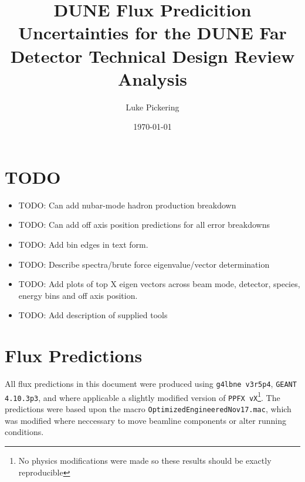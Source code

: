 \documentclass{article}
\title{DUNE Flux Predicition Uncertainties for the DUNE Far Detector Technical Design Review Analysis}
\author{Luke Pickering}
\date{\today}
\begin{document}
\maketitle


\section{TODO}

\begin{itemize}
\item TODO: Can add nubar-mode hadron production breakdown

\item TODO: Can add off axis position predictions for all error breakdowns

\item TODO: Add bin edges in text form.

\item TODO: Describe spectra/brute force eigenvalue/vector determination

\item TODO: Add plots of top X eigen vectors across beam mode, detector, species, energy bins and off axis position.

\item TODO: Add description of supplied tools
\end{itemize}

\section{Flux Predictions}

All flux predictions in this document were produced using \texttt{g4lbne v3r5p4}, \texttt{GEANT 4.10.3p3}, and where applicable a slightly modified version of \texttt{PPFX vX}\footnote{No physics modifications were made so these results should be exactly reproducible}. The predictions were based upon the macro \texttt{OptimizedEngineeredNov17.mac}, which was modified where neccessary to move beamline components or alter running conditions.
\end{document}
